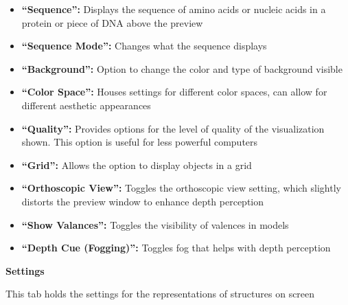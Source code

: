 \documentclass{article}
\begin{document}
\begin{itemize}

\item \textbf{“Sequence”:} Displays the sequence of amino acids or nucleic acids in a protein or piece of DNA above the preview 

\item \textbf{“Sequence Mode”:} Changes what the sequence displays

\item \textbf{“Background”:} Option to change the color and type of background visible

\item \textbf{“Color Space”:} Houses settings for different color spaces, can allow for different aesthetic appearances

\item \textbf{“Quality”:} Provides options for the level of quality of the visualization shown. This option is useful for less powerful computers

\item \textbf{“Grid”:} Allows the option to display objects in a grid

\item \textbf{“Orthoscopic View”:} Toggles the orthoscopic view setting, which slightly distorts the preview window to enhance depth perception

\item \textbf{“Show Valances”:}  Toggles the visibility of valences in models

\item \textbf{“Depth Cue (Fogging)”:} Toggles fog that helps with depth perception

\end{itemize}



\begin{center}
    \Large \textbf{Settings}
\end{center}

This tab holds the settings for the representations of structures on screen \\
\end{document}

